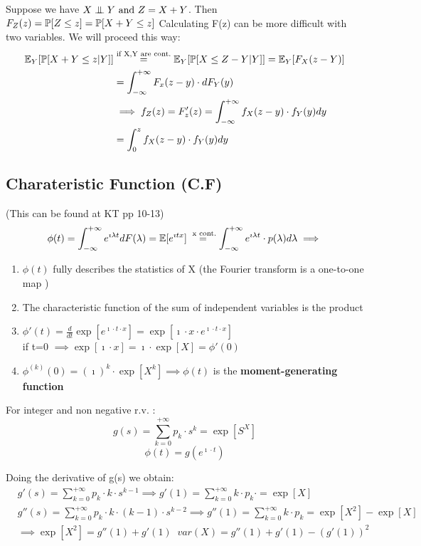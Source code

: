 Suppose we have $X \indep Y \text{ and } Z=X+Y$. Then $F_Z(z) = \prob[Z\le z] = \prob[X+Y \le z]$
Calculating F(z) can be more difficult with two variables. We will proceed this way:
\\
\begin{equation}\begin{split}
    \exp_{Y}[\prob[X+Y \le z | Y]]  &\stackrel{\text{if X,Y are cont.}}{=} \exp_Y [\prob[X \le Z - Y | Y]] = \exp_Y[F_X(z-Y)]\\
    &=\int_{-\infty}^{+\infty}F_x(z-y) \cdot dF_Y(y) \\
    &\implies f_Z(z) = F'_z(z) = \int_{-\infty}^{+\infty}{f_X(z-y)\cdot f_Y(y) dy} \\
    &=\int_{0}^{z}{f_X(z-y) \cdot f_Y(y) dy}
  \end{split}
\end{equation}


\subsection{Charateristic Function (C.F)}
(This can be found at KT pp 10-13)
\begin{equation}\phi(t) = \int_{-\infty}^{+\infty}e^{\imath \lambda t} dF(\lambda) = \exp[e^{\imath t x}]\stackrel{\text{ x cont.}}{=}
  \int_{-\infty}^{+\infty}e^{\imath \lambda t} \cdot p(\lambda) d\lambda
  \\ \implies
\end{equation}
\begin{enumerate}
  \item $\phi(t)$ fully describes the statistics of X (the Fourier transform is a  one-to-one map )
  \item The characteristic function of the sum of independent variables is the product
  \item $\phi'(t)=\frac{d}{dt} \exp[e^{\imath \cdot t \cdot x}]=\exp[\imath \cdot x \cdot e^{\imath \cdot t \cdot x}]$ \\
  if t=0 $\implies \exp[\imath \cdot x]=\imath \cdot \exp[ X] = \phi'(0)$
  \item $\phi^{(k)}(0) = (\imath)^k \cdot \exp[X^k] \implies \phi(t)$ is the \textbf{moment-generating function}
\end{enumerate}


For integer and non negative r.v. :
$$g(s)=\sum\limits_{k=0}^{+\infty}p_k \cdot s^k = \exp[S^X]$$
$$\phi(t) = g(e^{\imath \cdot t})$$

Doing the derivative of g(s) we obtain:
\begin{equation}
  \begin{split}
    & g'(s) = \sum\limits_{k=0}^{+\infty} p_k \cdot k \cdot s^{k-1}
    \implies g'(1) = \sum\limits_{k=0}^{+\infty} k \cdot p_k \cdot = \exp[X] \\
    & g''(s) = \sum\limits_{k=0}^{+\infty} p_k \cdot k \cdot (k-1) \cdot s^{k-2}
    \implies g''(1) = \sum\limits_{k=0}^{+\infty} k \cdot p_k = \exp[X^2]-\exp[X] \\
    &\implies \exp[X^2] = g''(1)+g'(1) \; \; var(X) = g''(1)+g'(1)-(g'(1))^2
  \end{split}
\end{equation}

